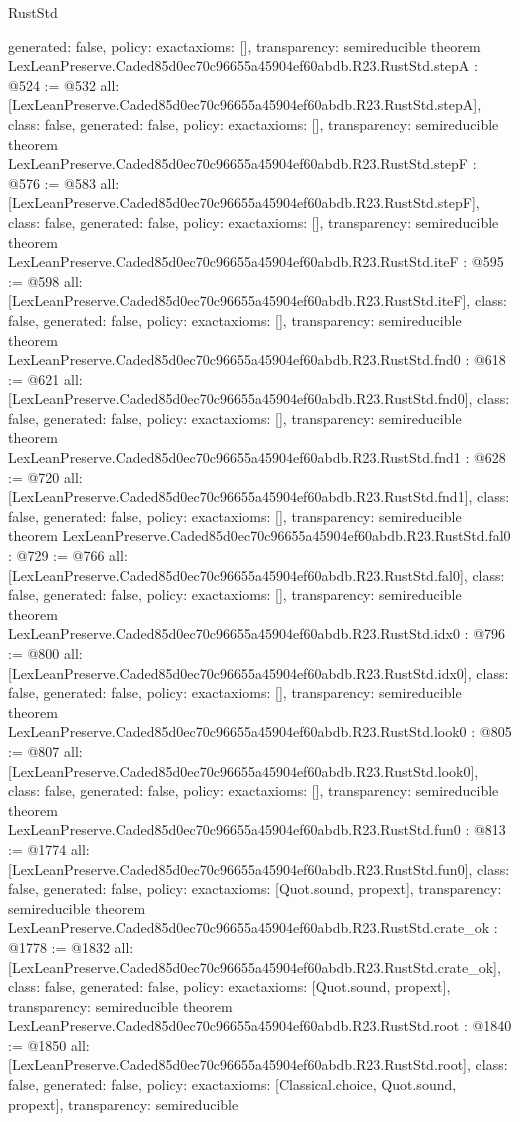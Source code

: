 \begin{lexlean}{RustStd}
\begin{coremodule}
{  generated: false,
  policy: exact{axioms: []},
  transparency: semireducible
}
theorem LexLeanPreserve.Caded85d0ec70c96655a45904ef60abdb.R23.RustStd.stepA : @524 := @532 {
  all: [LexLeanPreserve.Caded85d0ec70c96655a45904ef60abdb.R23.RustStd.stepA],
  class: false,
  generated: false,
  policy: exact{axioms: []},
  transparency: semireducible
}
theorem LexLeanPreserve.Caded85d0ec70c96655a45904ef60abdb.R23.RustStd.stepF : @576 := @583 {
  all: [LexLeanPreserve.Caded85d0ec70c96655a45904ef60abdb.R23.RustStd.stepF],
  class: false,
  generated: false,
  policy: exact{axioms: []},
  transparency: semireducible
}
theorem LexLeanPreserve.Caded85d0ec70c96655a45904ef60abdb.R23.RustStd.iteF : @595 := @598 {
  all: [LexLeanPreserve.Caded85d0ec70c96655a45904ef60abdb.R23.RustStd.iteF],
  class: false,
  generated: false,
  policy: exact{axioms: []},
  transparency: semireducible
}
theorem LexLeanPreserve.Caded85d0ec70c96655a45904ef60abdb.R23.RustStd.fnd0 : @618 := @621 {
  all: [LexLeanPreserve.Caded85d0ec70c96655a45904ef60abdb.R23.RustStd.fnd0],
  class: false,
  generated: false,
  policy: exact{axioms: []},
  transparency: semireducible
}
theorem LexLeanPreserve.Caded85d0ec70c96655a45904ef60abdb.R23.RustStd.fnd1 : @628 := @720 {
  all: [LexLeanPreserve.Caded85d0ec70c96655a45904ef60abdb.R23.RustStd.fnd1],
  class: false,
  generated: false,
  policy: exact{axioms: []},
  transparency: semireducible
}
theorem LexLeanPreserve.Caded85d0ec70c96655a45904ef60abdb.R23.RustStd.fal0 : @729 := @766 {
  all: [LexLeanPreserve.Caded85d0ec70c96655a45904ef60abdb.R23.RustStd.fal0],
  class: false,
  generated: false,
  policy: exact{axioms: []},
  transparency: semireducible
}
theorem LexLeanPreserve.Caded85d0ec70c96655a45904ef60abdb.R23.RustStd.idx0 : @796 := @800 {
  all: [LexLeanPreserve.Caded85d0ec70c96655a45904ef60abdb.R23.RustStd.idx0],
  class: false,
  generated: false,
  policy: exact{axioms: []},
  transparency: semireducible
}
theorem LexLeanPreserve.Caded85d0ec70c96655a45904ef60abdb.R23.RustStd.look0 : @805 := @807 {
  all: [LexLeanPreserve.Caded85d0ec70c96655a45904ef60abdb.R23.RustStd.look0],
  class: false,
  generated: false,
  policy: exact{axioms: []},
  transparency: semireducible
}
theorem LexLeanPreserve.Caded85d0ec70c96655a45904ef60abdb.R23.RustStd.fun0 : @813 := @1774 {
  all: [LexLeanPreserve.Caded85d0ec70c96655a45904ef60abdb.R23.RustStd.fun0],
  class: false,
  generated: false,
  policy: exact{axioms: [Quot.sound, propext]},
  transparency: semireducible
}
theorem LexLeanPreserve.Caded85d0ec70c96655a45904ef60abdb.R23.RustStd.crate_ok : @1778 := @1832 {
  all: [LexLeanPreserve.Caded85d0ec70c96655a45904ef60abdb.R23.RustStd.crate_ok],
  class: false,
  generated: false,
  policy: exact{axioms: [Quot.sound, propext]},
  transparency: semireducible
}
theorem LexLeanPreserve.Caded85d0ec70c96655a45904ef60abdb.R23.RustStd.root : @1840 := @1850 {
  all: [LexLeanPreserve.Caded85d0ec70c96655a45904ef60abdb.R23.RustStd.root],
  class: false,
  generated: false,
  policy: exact{axioms: [Classical.choice, Quot.sound, propext]},
  transparency: semireducible
}


\end{coremodule}
\end{lexlean}
